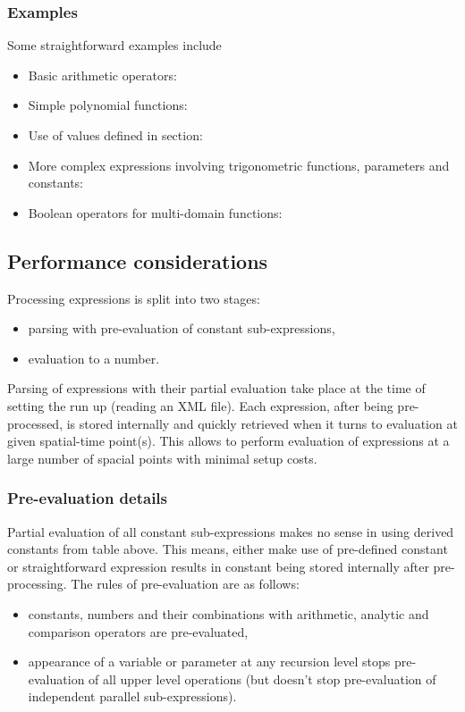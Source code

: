 \subsubsection{Examples}
Some straightforward examples include
\begin{itemize}
\item Basic arithmetic operators: 
\item Simple polynomial functions: 
\item Use of values defined in  section:
\item More complex expressions involving trigonometric functions, parameters and
constants: 
\item Boolean operators for multi-domain functions:
\end{itemize}

\subsection{Performance considerations}
Processing expressions is split into two stages:
\begin{itemize}
\item parsing with pre-evaluation of constant sub-expressions,
\item evaluation to a number.
\end{itemize}
Parsing of expressions with their partial evaluation take place at the
time of setting the run up (reading an XML file). Each expression,
after being pre-processed, is stored internally and quickly retrieved when it
turns to evaluation at given spatial-time point(s). This allows to perform
evaluation of expressions at a large number of spacial points with minimal setup
costs.

\subsubsection{Pre-evaluation details}
Partial evaluation of all constant sub-expressions makes no sense in using
derived constants from table above. This means, either make use of pre-defined
constant  or straightforward expression 
results in constant  being stored internally after
pre-processing. The rules of pre-evaluation are as follows:
\begin{itemize}
\item constants, numbers and their combinations with arithmetic, analytic and
 comparison operators are pre-evaluated,
\item appearance of a variable or parameter
 at any recursion level stops pre-evaluation of all upper level operations (but
 doesn't stop pre-evaluation of independent parallel sub-expressions).
\end{itemize}

